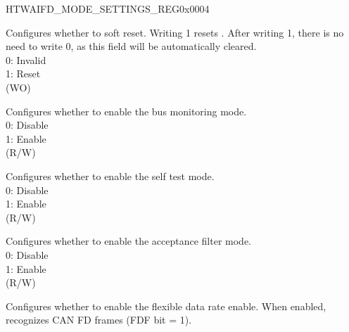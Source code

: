 \begin{register}{H}{TWAIFD\_MODE\_SETTINGS\_REG}{0x0004}\label{regdesc:TWAIFDMODESETTINGSREG}
%
%
%
%
%
%
%
%
%
%
%
%
%
%
%
%
%
%
%
%
%
%
%
\regnewline%
\begin{regdesc}\begin{reglist}
\label{fielddesc:TWAIFDRST}\item [TWAIFD\_RST] Configures whether to soft reset. Writing 1 resets \modulename. After writing 1, there is no need to write 0, as this field will be automatically cleared.\\
0: Invalid\\
1: Reset\\(WO)
\label{fielddesc:TWAIFDBMM}\item [TWAIFD\_BMM] Configures whether to enable the bus monitoring mode.\\
0: Disable\\
1: Enable\\(R/W)
\label{fielddesc:TWAIFDSTM}\item [TWAIFD\_STM] Configures whether to enable the self test mode.\\
0: Disable\\
1: Enable\\(R/W)
\label{fielddesc:TWAIFDAFM}\item [TWAIFD\_AFM] Configures whether to enable the acceptance filter mode.\\
0: Disable\\
1: Enable\\(R/W)
\label{fielddesc:TWAIFDFDE}\item [TWAIFD\_FDE] Configures whether to enable the flexible data rate enable. When enabled, \modulename recognizes CAN FD frames (FDF bit = 1).\\

\end{reglist}
\end{regdesc}
\end{register}
